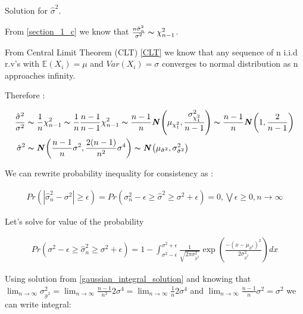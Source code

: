 \begin{solution}
Solution for $\hat{\sigma}^2$.

From \ref{section_1_c} we know that $\frac{n\hat{\sigma}^2_n}{\sigma^2} \thicksim \chi^2_{n-1}$. 

From Central Limit Theorem (CLT) \eqref{CLT} we know that any sequence of n i.i.d r.v's with $\mathbb{E}(X_i) = \mu$ and $Var(X_i) = \sigma$ converges to normal distribution as n approaches infinity. 

Therefore : 

\begin{equation}
\begin{aligned}
\frac{\hat{\sigma}^2}{\sigma^2} & \thicksim \frac{1}{n}\chi^2_{n-1}	
																	\thicksim \frac{1}{n}\frac{n-1}{n-1}\chi^2_{n-1}	
																	\thicksim \frac{n-1}{n}\textbf{\em N}\left(\mu_{\chi_1^2}, \frac{\sigma_{\chi_1^2}^2}{n-1}\right) 
																  \thicksim \frac{n-1}{n}\textbf{\em N}\left(1, \frac{2}{n-1}\right) \\
								\hat{\sigma}^2	& \thicksim \textbf{\em N}\left(\frac{n-1}{n}\sigma^2, \frac{2(n-1)}{n^2}\sigma^4\right)
																	\thicksim \textbf{\em N}\left(\mu_{\hat{\sigma}^2}, \sigma^2_{\hat{\sigma}^2}\right)
\end{aligned}																
\end{equation}

We can rewrite probability inequality for consistency as :

\begin{equation}
\begin{split}
Pr(|\hat{\sigma}^2_n - \sigma^2| \geq \epsilon) 
	 =  Pr( \sigma^2_n - \epsilon \geq \hat{\sigma}^2 \geq \sigma^2 + \epsilon) = 0, \bigvee \epsilon\geq 0, n \to \infty
\end{split}
\end{equation}

Let's solve for value of the probability

\begin{equation}
\begin{split}
Pr( \sigma^2 - \epsilon \geq \hat{\sigma}^2_n \geq \sigma^2 + \epsilon)
   =1 - \int_{\sigma^2-\epsilon}^{\sigma^2+\epsilon}\frac{1}{\sqrt{2\pi\sigma^2_{\hat{\sigma}^2}}}\exp\left(\frac{-(x - \mu_{\hat{\sigma}^2})^2}{2\sigma^2_{\hat{\sigma}^2}}\right)dx
\end{split}
\end{equation}

Using solution from \ref{gaussian_integral_solution} and knowing that $\lim_{n \to \infty}\sigma^2_{\hat{\sigma}^2} = \lim_{n \to \infty}\frac{n-1}{n^2}2\sigma^4 = \lim_{n \to \infty} \frac{1}{n}2\sigma^4 $ and $\lim_{n \to \infty}\frac{n-1}{n}\sigma^2 = \sigma^2 $ we can write integral:


\end{solution}
